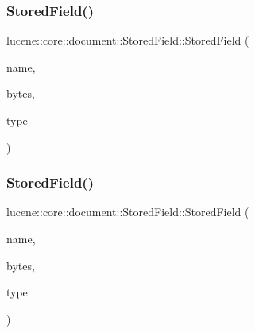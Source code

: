 \mbox{\label{classlucene_1_1core_1_1document_1_1StoredField_a0a4b22c3f5bc1760d3d1b38d37d583cf}} 
\subsubsection{\texorpdfstring{Stored\+Field()}{StoredField()}\hspace{0.1cm}{\footnotesize\ttfamily [2/15]}}
{\footnotesize\ttfamily lucene\+::core\+::document\+::\+Stored\+Field\+::\+Stored\+Field (\begin{DoxyParamCaption}\item[{\mbox{\hyperlink{ZlibCrc32_8h_a2c212835823e3c54a8ab6d95c652660e}{const}} std\+::string \&}]{name,  }\item[{\mbox{\hyperlink{ZlibCrc32_8h_a2c212835823e3c54a8ab6d95c652660e}{const}} \mbox{\hyperlink{classlucene_1_1core_1_1util_1_1BytesRef}{lucene\+::core\+::util\+::\+Bytes\+Ref}} \&}]{bytes,  }\item[{\mbox{\hyperlink{ZlibCrc32_8h_a2c212835823e3c54a8ab6d95c652660e}{const}} \mbox{\hyperlink{classlucene_1_1core_1_1document_1_1FieldType}{Field\+Type}} \&}]{type }\end{DoxyParamCaption})\hspace{0.3cm}{\ttfamily [inline]}}

\mbox{\label{classlucene_1_1core_1_1document_1_1StoredField_a446cec91e91723b05e371140a08cf398}} 
\subsubsection{\texorpdfstring{Stored\+Field()}{StoredField()}\hspace{0.1cm}{\footnotesize\ttfamily [3/15]}}
{\footnotesize\ttfamily lucene\+::core\+::document\+::\+Stored\+Field\+::\+Stored\+Field (\begin{DoxyParamCaption}\item[{\mbox{\hyperlink{ZlibCrc32_8h_a2c212835823e3c54a8ab6d95c652660e}{const}} std\+::string \&}]{name,  }\item[{\mbox{\hyperlink{classlucene_1_1core_1_1util_1_1BytesRef}{lucene\+::core\+::util\+::\+Bytes\+Ref}} \&\&}]{bytes,  }\item[{\mbox{\hyperlink{ZlibCrc32_8h_a2c212835823e3c54a8ab6d95c652660e}{const}} \mbox{\hyperlink{classlucene_1_1core_1_1document_1_1FieldType}{Field\+Type}} \&}]{type }\end{DoxyParamCaption})\hspace{0.3cm}{\ttfamily [inline]}}

